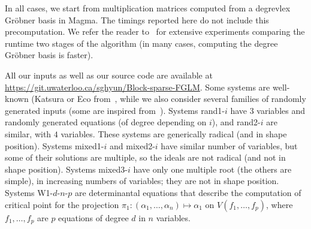 \documentclass[12pt]{article}
\begin{document}
In all cases, we start from multiplication matrices computed from a
{degrevlex} Gr\"obner basis in Magma. The timings reported here do not
include this precomputation. We refer the reader to~\cite{FaMo17} for
extensive experiments comparing the runtime two stages of the
algorithm (in many cases, computing the degree Gr\"obner basis is
faster). 

All our inputs as well as our source code are available at
\url{https://git.uwaterloo.ca/sghyun/Block-sparse-FGLM}. Some systems
are well-known (Katsura or Eco from~\cite{Morgan88}, while we also
consider several families of randomly generated inputs (some are
inspired from~\cite{FaMo17}). Systems rand1-$i$ have $3$ variables and
randomly generated equations (of degree depending on $i$), and
rand2-$i$ are similar, with $4$ variables. These systems are
generically radical (and in shape position). Systems mixed1-$i$ and
mixed2-$i$ have similar number of variables, but some of their
solutions are multiple, so the ideals are not radical (and not in
shape position). Systems mixed3-$i$ have only one multiple root (the
others are simple), in increasing numbers of variables; they are not
in shape position. Systems W1-$d$-$n$-$p$ are determinantal equations
that describe the computation of critical point for the projection
$\pi_1: (\alpha_1,\dots,\alpha_n) \mapsto \alpha_1$ on
$V(f_1,\dots,f_p)$, where $f_1,\dots,f_p$ are $p$ equations of degree
$d$ in $n$ variables.
\end{document}
